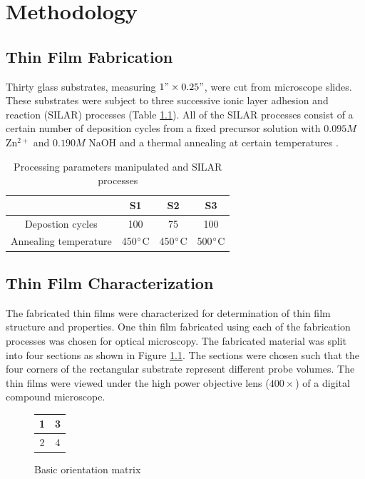 \chapter{Methodology}
\section{Thin Film Fabrication}
Thirty glass substrates, measuring $1"\times0.25"$, were cut from microscope slides.
These substrates were subject to three successive ionic layer adhesion and reaction (SILAR) processes (Table \ref{tab:processes}).
All of the SILAR processes consist of a certain number of deposition cycles from a fixed precursor solution with $0.095M$ Zn$^{2+}$ and $0.190M$ NaOH and a thermal annealing at certain temperatures \cite{gao08, florido17}.

\begin{table}
  \caption[SILAR Processes]{Processing parameters manipulated and SILAR processes}
  \centering
  \begin{tabular}{c c c c}
    \hline\hline
     & S1 & S2 & S3 \\
    \hline
    Depostion cycles & 100 & 75 & 100 \\
    Annealing temperature & 450$^{\circ}$C & 450$^{\circ}$C & 500$^{\circ}$C \\[1ex]
    \hline
  \end{tabular}
  \label{tab:processes}
\end{table}

\section{Thin Film Characterization}
The fabricated thin films were characterized for determination of thin film structure and properties.
One thin film fabricated using each of the fabrication processes was chosen for optical microscopy.
The fabricated material was split into four sections as shown in Figure \ref{fig:orient}.
The sections were chosen such that the four corners of the rectangular substrate represent different probe volumes.
The thin films were viewed under the high power objective lens ($400\times$) of a digital compound microscope.

\begin{figure}
  \centering
  \begin{tabular}{| c | c |}
    \hline
    1 & 3 \\
    \hline
    2 & 4 \\[0.5ex]
    \hline
  \end{tabular}
  \caption{Basic orientation matrix}
  \label{fig:orient}
\end{figure}

